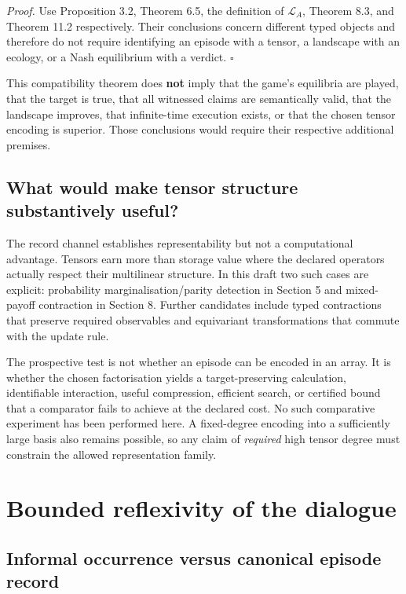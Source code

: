 \documentclass[11pt,a4paper]{article}
\begin{document}
\emph{Proof.} Use Proposition 3.2, Theorem 6.5, the definition of
\(\mathcal L_A\), Theorem 8.3, and Theorem 11.2 respectively. Their
conclusions concern different typed objects and therefore do not require
identifying an episode with a tensor, a landscape with an ecology, or a
Nash equilibrium with a verdict. \(\square\)

This compatibility theorem does \textbf{not} imply that the game's
equilibria are played, that the target is true, that all witnessed
claims are semantically valid, that the landscape improves, that
infinite-time execution exists, or that the chosen tensor encoding is
superior. Those conclusions would require their respective additional
premises.

\subsection{What would make tensor structure substantively
useful?}\label{what-would-make-tensor-structure-substantively-useful}

The record channel establishes representability but not a computational
advantage. Tensors earn more than storage value where the declared
operators actually respect their multilinear structure. In this draft
two such cases are explicit: probability marginalisation/parity
detection in Section 5 and mixed-payoff contraction in Section 8.
Further candidates include typed contractions that preserve required
observables and equivariant transformations that commute with the update
rule.

The prospective test is not whether an episode can be encoded in an
array. It is whether the chosen factorisation yields a target-preserving
calculation, identifiable interaction, useful compression, efficient
search, or certified bound that a comparator fails to achieve at the
declared cost. No such comparative experiment has been performed here. A
fixed-degree encoding into a sufficiently large basis also remains
possible, so any claim of \emph{required} high tensor degree must
constrain the allowed representation family.

\section{Bounded reflexivity of the
dialogue}\label{bounded-reflexivity-of-the-dialogue}

\subsection{Informal occurrence versus canonical episode
record}\label{informal-occurrence-versus-canonical-episode-record}
\end{document}
